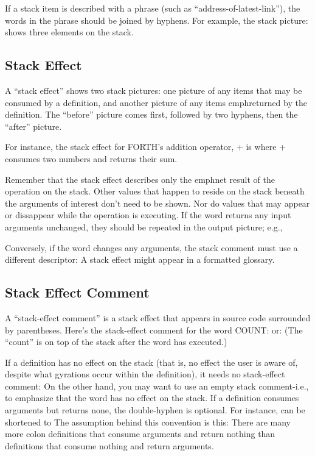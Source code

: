 If a stack item is described with a phrase (such as ``address-of-latest-link''),
the words in the phrase should be joined by hyphens.  For
example, the stack picture:
shows three elements on the stack.

\subsection{Stack Effect}

A ``stack effect'' shows two stack pictures: one picture of any items that
may be consumed by a definition, and another picture of any items
emph{returned} by the definition.  The ``before'' picture comes first, followed by
two hyphens, then the ``after'' picture.

For instance, the stack effect for FORTH's addition operator, + is
where + consumes two numbers and returns their sum.

Remember that the stack effect describes only the emph{net result} of the
operation on the stack.  Other values that happen to reside on the stack
beneath the arguments of interest don't need to be shown.  Nor do values
that may appear or dissappear while the operation is executing.
If the word returns any input arguments unchanged, they should be
repeated in the output picture; e.g.,

Conversely, if the word changes any arguments, the stack comment must
use a different descriptor:
A stack effect might appear in a formatted glossary.

\subsection{Stack Effect Comment}

A ``stack-effect comment'' is a stack effect that appears in source code
surrounded by parentheses.  Here's the stack-effect comment for the word
COUNT:
or:
(The ``count'' is on top of the stack after the word has executed.)

If a definition has no effect on the stack (that is, no effect the user is
aware of, despite what gyrations occur within the definition), it needs no
stack-effect comment:
On the other hand, you may want to use an empty stack comment-i.e.,
to emphasize that the word has no effect on the stack.
If a definition consumes arguments but returns none, the double-hyphen
is optional.  For instance,
can be shortened to
The assumption behind this convention is this: There are many more
colon definitions that consume arguments and return nothing than
definitions that consume nothing and return arguments.

